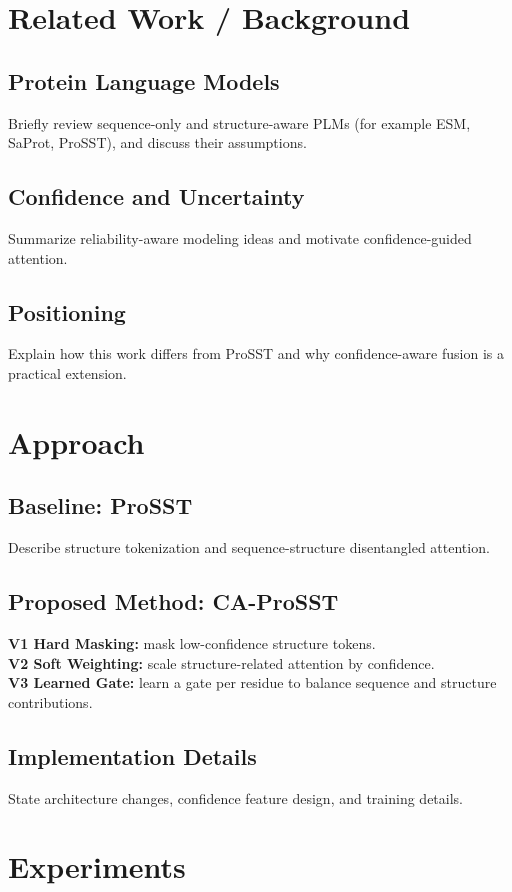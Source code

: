 \documentclass[11pt,a4paper]{article}
\begin{document}
\section{Related Work / Background}
\subsection{Protein Language Models}
Briefly review sequence-only and structure-aware PLMs (for example ESM, SaProt, ProSST), and discuss their assumptions.

\subsection{Confidence and Uncertainty}
Summarize reliability-aware modeling ideas and motivate confidence-guided attention.

\subsection{Positioning}
Explain how this work differs from ProSST and why confidence-aware fusion is a practical extension.

\section{Approach}
\subsection{Baseline: ProSST}
Describe structure tokenization and sequence-structure disentangled attention.

\subsection{Proposed Method: CA-ProSST}
\textbf{V1 Hard Masking:} mask low-confidence structure tokens. \\
\textbf{V2 Soft Weighting:} scale structure-related attention by confidence. \\
\textbf{V3 Learned Gate:} learn a gate per residue to balance sequence and structure contributions.

\subsection{Implementation Details}
State architecture changes, confidence feature design, and training details.

\section{Experiments}
\end{document}
